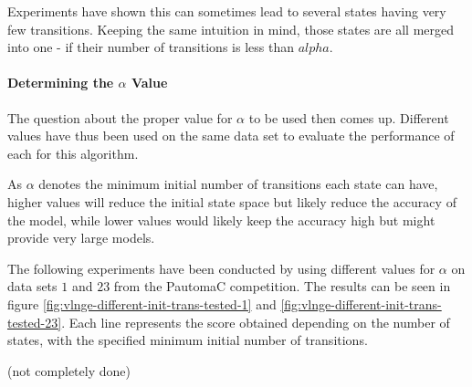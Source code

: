 Experiments have shown this can sometimes lead to several states having very few transitions. Keeping the same intuition in mind, those states are all merged into one - if their number of transitions is less than $alpha$.

\paragraph{Determining the $\alpha$ Value}

The question about the proper value for $\alpha$ to be used then comes up. Different values have thus been used on the same data set to evaluate the performance of each for this algorithm.

As $\alpha$ denotes the minimum initial number of transitions each state can have, higher values will reduce the initial state space but likely reduce the accuracy of the model, while lower values would likely keep the accuracy high but might provide very large models.

The following experiments have been conducted by using different values for $\alpha$ on data sets $1$ and $23$ from the PautomaC competition. The results can be seen in figure \ref{fig:vlnge-different-init-trans-tested-1} and \ref{fig:vlnge-different-init-trans-tested-23}. Each line represents the score obtained depending on the number of states, with the specified minimum initial number of transitions.

(not completely done)

